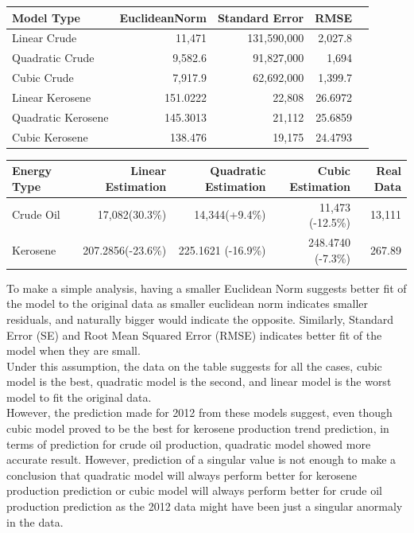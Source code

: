 \documentclass[unicode,11pt,a4paper,oneside,numbers=endperiod,openany]{scrartcl}
\begin{document}
\begin{enumerate}[label=(\alph*)]
\begin{center}
\begin{tabular}{|l|r|r|r|r|} \hline
Model Type & EuclideanNorm & Standard Error & RMSE \\
\hline
  Linear Crude  & 11,471 & 131,590,000 & 2,027.8\\
\hline
  Quadratic Crude & 9,582.6 & 91,827,000 & 1,694\\
\hline
  Cubic Crude & 7,917.9 & 62,692,000 & 1,399.7 \\
  \hline
  Linear Kerosene & 151.0222 & 22,808 & 26.6972\\
\hline
  Quadratic Kerosene & 145.3013 & 21,112 & 25.6859\\
\hline
  Cubic Kerosene & 138.476 & 19,175 & 24.4793 \\
  \hline
\end{tabular}
\end{center}

\vspace{20px}

\begin{tabular}{|l|r|r|r|r|} \hline
Energy Type & Linear Estimation & Quadratic Estimation & Cubic Estimation & Real Data \\
\hline
 Crude Oil & 17,082(30.3\%) & 14,344(+9.4\%) & 11,473 (-12.5\%) & 13,111\\
\hline
Kerosene & 207.2856(-23.6\%) & 225.1621 (-16.9\%) & 248.4740 (-7.3\%) & 267.89\\
\hline
\end{tabular}
\vspace{20px}

To make a simple analysis, having a smaller Euclidean Norm suggests better fit of the model to the original data as smaller euclidean norm indicates smaller residuals, and naturally bigger would indicate the opposite. Similarly, Standard Error (SE) and Root Mean Squared Error (RMSE) indicates better fit of the model when they are small. \\

Under this assumption, the data on the table suggests for all the cases, cubic model is the best, quadratic model is the second, and linear model is the worst model to fit the original data. \\

However, the prediction made for 2012 from these models suggest, even though cubic model proved to be the best for kerosene production trend prediction, in terms of prediction for crude oil production, quadratic model showed more accurate result. However, prediction of a singular value is not enough to make a conclusion that quadratic model will always perform better for kerosene production prediction or cubic model will always perform better for crude oil production prediction as the 2012 data might have been just a singular anormaly in the data.\\


\end{enumerate}
\end{document}
